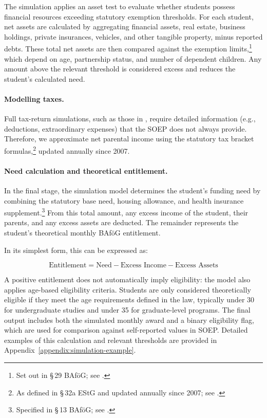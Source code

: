 The simulation applies an asset test to evaluate whether students possess financial resources exceeding statutory exemption thresholds. 
For each student, net assets are calculated by aggregating financial assets, real estate, business holdings, private insurances, vehicles, and other tangible property, minus reported debts. 
These total net assets are then compared against the exemption limits,\footnote{Set out in §\,29 BAföG; see \citet{bafoeg_law}.} which depend on age, partnership status, and number of dependent children. 
Any amount above the relevant threshold is considered excess and reduces the student's calculated need.

\paragraph{Modelling taxes.}
Full tax-return simulations, such as those in \cite{herber_non-take-up_2019}, require detailed information (e.g., deductions, extraordinary expenses) that the SOEP does not always provide.  
Therefore, we approximate net parental income using the statutory tax bracket formulas,\footnote{As defined in §\,32a EStG and updated annually since 2007; see \citet{estg_law,estg_2025,estg_2024,estg_2023,estg_2022,estg_2021,estg_2020,estg_2019,estg_2018,estg_2017,estg_2016,estg_2015,estg_2014,estg_2013,estg_2012,estg_2007,estg_2006}.} updated annually since 2007.

\paragraph{Need calculation and theoretical entitlement.}
In the final stage, the simulation model determines the student's funding need by combining the statutory base need, housing allowance, and health insurance supplement.\footnote{Specified in §\,13 BAföG; see \citet{bafoeg_law}.} 
From this total amount, any excess income of the student, their parents, and any excess assets are deducted. The remainder represents the student's theoretical monthly BAföG entitlement.

In its simplest form, this can be expressed as:

\begin{equation}
    \text{Entitlement} = \text{Need} - \text{Excess Income} - \text{Excess Assets}
\end{equation}

A positive entitlement does not automatically imply eligibility: the model also applies age-based eligibility criteria. 
Students are only considered theoretically eligible if they meet the age requirements defined in the law, typically under 30 for undergraduate studies and under 35 for graduate-level programs. 
The final output includes both the simulated monthly award and a binary eligibility flag, which are used for comparison against self-reported values in SOEP. 
Detailed examples of this calculation and relevant thresholds are provided in Appendix~\ref{appendix:simulation-example}.

